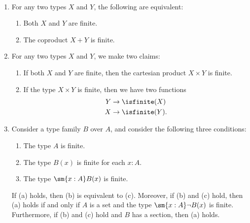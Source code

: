 \begin{thm} ~
  \begin{enumerate}
    \item \label{item:coproduct-finite-types}For any two types $X$ and $Y$, the following are equivalent:
    \begin{enumerate}
    \item Both $X$ and $Y$ are finite.
    \item The coproduct $X+Y$ is finite.
    \end{enumerate}
  \item \label{item:product-finite-types}For any two types $X$ and $Y$, we make two claims:
    \begin{enumerate}
    \item If both $X$ and $Y$ are finite, then the cartesian product $X\times Y$ is finite.
    \item If the type $X\times Y$ is finite, then we have two functions
      \begin{align*}
        Y & \to \isfinite(X) \\
        X & \to \isfinite(Y).
      \end{align*}
    \end{enumerate}
  \item \label{item:Sigma-finite-types}Consider a type family $B$ over $A$, and consider the following three conditions:
    \begin{enumerate}
    \item The type $A$ is finite.
    \item The type $B(x)$ is finite for each $x:A$.
    \item The type $\sm{x:A}B(x)$ is finite.
    \end{enumerate}
    If (a) holds, then (b) is equivalent to (c). Moreover, if (b) and (c) hold, then (a) holds if and only if $A$ is a set and the type $\sm{x:A}\neg B(x)$ is finite. Furthermore, if (b) and (c) hold and $B$ has a section, then (a) holds.
  \end{enumerate}
\end{thm}

